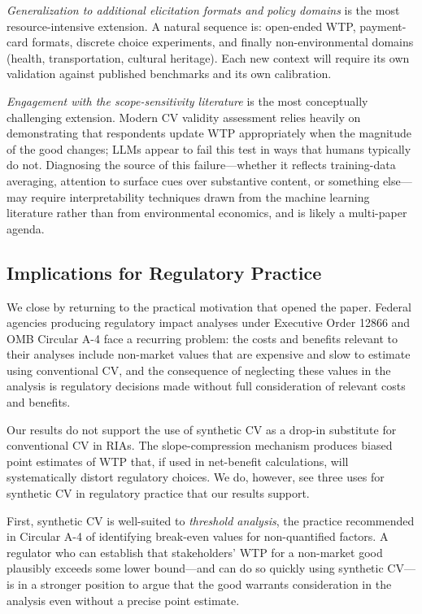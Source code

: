 \documentclass[12pt]{article}
\begin{document}
\textit{Generalization to additional elicitation formats and policy domains} is the most resource-intensive extension. A natural sequence is: open-ended WTP, payment-card formats, discrete choice experiments, and finally non-environmental domains (health, transportation, cultural heritage). Each new context will require its own validation against published benchmarks and its own calibration.

\textit{Engagement with the scope-sensitivity literature} is the most conceptually challenging extension. Modern CV validity assessment relies heavily on demonstrating that respondents update WTP appropriately when the magnitude of the good changes; LLMs appear to fail this test in ways that humans typically do not. Diagnosing the source of this failure---whether it reflects training-data averaging, attention to surface cues over substantive content, or something else---may require interpretability techniques drawn from the machine learning literature rather than from environmental economics, and is likely a multi-paper agenda.

\subsection{Implications for Regulatory Practice}\label{sec:disc-policy}

We close by returning to the practical motivation that opened the paper. Federal agencies producing regulatory impact analyses under Executive Order 12866 and OMB Circular A-4 face a recurring problem: the costs and benefits relevant to their analyses include non-market values that are expensive and slow to estimate using conventional CV, and the consequence of neglecting these values in the analysis is regulatory decisions made without full consideration of relevant costs and benefits.

Our results do not support the use of synthetic CV as a drop-in substitute for conventional CV in RIAs. The slope-compression mechanism produces biased point estimates of WTP that, if used in net-benefit calculations, will systematically distort regulatory choices. We do, however, see three uses for synthetic CV in regulatory practice that our results support.

First, synthetic CV is well-suited to \emph{threshold analysis}, the practice recommended in Circular A-4 of identifying break-even values for non-quantified factors. A regulator who can establish that stakeholders' WTP for a non-market good plausibly exceeds some lower bound---and can do so quickly using synthetic CV---is in a stronger position to argue that the good warrants consideration in the analysis even without a precise point estimate.
\end{document}
